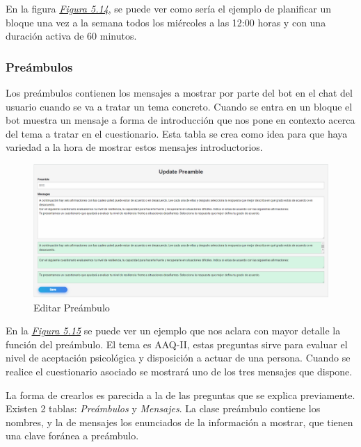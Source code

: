 En la figura \textit{\hyperref[fig:planificacion_bloque]{Figura 5.14}}, se puede ver como sería el ejemplo de planificar un bloque una vez a la semana todos los miércoles a las 12:00 horas y con una duración activa de 60 minutos.\vspace{0.3cm}

\subsubsection{Preámbulos}

Los preámbulos contienen los mensajes a mostrar por parte del bot en el chat del usuario cuando se va a tratar un tema concreto. Cuando se entra en un bloque el bot muestra un mensaje a forma de introducción que nos pone en contexto acerca del tema a tratar en el cuestionario. Esta tabla se crea como idea para que haya variedad a la hora de mostrar estos mensajes introductorios. \vspace{0.7cm}

\begin{figure}[!ht]
    \centering
    \includegraphics[width=1\textwidth]{imagenes/update_preamble.png}
    \caption{Editar Preámbulo}
    \label{fig:update-preamble}
\end{figure}\vspace{0.7cm}

En la \textit{\hyperref[fig:update-preamble]{Figura 5.15}} se puede ver un ejemplo que nos aclara con mayor detalle la función del preámbulo. El tema es AAQ-II, estas preguntas sirve para evaluar el nivel de aceptación psicológica y disposición a actuar de una persona. Cuando se realice el cuestionario asociado se mostrará uno de los tres mensajes que dispone. 

La forma de crearlos es parecida a la de las preguntas que se explica previamente. Existen 2 tablas: \textit{Preámbulos} y \textit{Mensajes}. La clase preámbulo contiene los nombres, y la de mensajes los enunciados de la información a mostrar, que tienen una clave foránea a preámbulo.\vspace{1.5cm}

